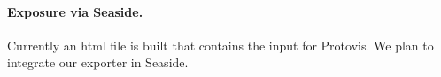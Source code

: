 \documentclass[preprint,10pt]{sigplanconf}
\newcommand{\seclabel}[1]{\label{sec:#1}}
\begin{document}
\paragraph{Exposure via Seaside.} Currently an html file is built that contains the input for Protovis. We plan to integrate our exporter in Seaside.






%



\end{document}
